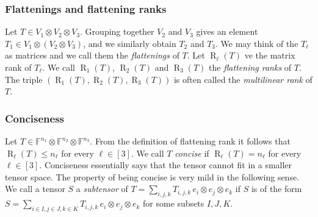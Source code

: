 \documentclass{daj}
\DeclareMathOperator{\tensorrank}{R}
\newcommand{\FF}{\mathbb{F}}
\begin{document}
\subsubsection*{Flattenings and flattening ranks}
Let $T \in V_1 \otimes V_2 \otimes V_3$. Grouping together $V_2$ and $V_3$ gives an element  $T_{1} \in V_1 \otimes (V_2 \otimes V_3)$, and we similarly obtain $T_2$ and $T_3$. %
We may think of the $T_\ell$ as matrices and we call them 
the \emph{flattenings} of $T$.
Let $\tensorrank_{\ell}(T)$ ve the matrix rank of $T_{\ell}$. We call $\tensorrank_1(T)$, $\tensorrank_2(T)$ and $\tensorrank_3(T)$ 
the \emph{flattening ranks} of $T$.
The triple $(\tensorrank_1(T), \tensorrank_2(T), \tensorrank_3(T))$ is often called the \emph{multilinear rank} of $T$. 


\subsubsection*{Conciseness} 
Let $T \in \FF^{n_1} \otimes \FF^{n_2} \otimes \FF^{n_3}$. From the definition of flattening rank it follows that $\tensorrank_\ell(T) \leq n_\ell$ for every $\ell \in [3]$. We call $T$ \emph{concise} if $\tensorrank_\ell(T) = n_\ell$  for every~$\ell \in [3]$. Conciseness essentially says that the tensor cannot fit in a smaller tensor space. The property of being concise is very mild in the following sense. We call a tensor $S$ a \emph{subtensor} of $T = \sum_{i,j,k} T_{i,j,k}\, e_i \otimes e_j \otimes e_k$ if $S$ is of the form $S = \sum_{i\in I,j\in J,k\in K} T_{i,j,k}\, e_i \otimes e_j \otimes e_k$ for some subsets $I,J,K$.
\end{document}
